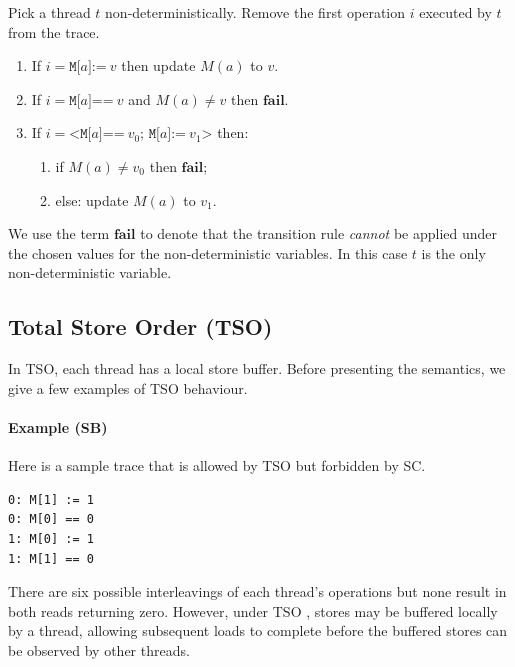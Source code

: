 \documentclass[11pt]{article}
\begin{document}
Pick a thread $t$ non-deterministically.  Remove the first operation
$i$ executed by $t$ from the trace.

\begin{enumerate}
\item
     If $i = \texttt{M[}a\texttt{]:=}~v$ then update $M(a)$ to $v$.

\item
     If $i = \texttt{M[}a\texttt{]==}~v$ and $M(a) \neq v$
     then $\textbf{fail}$.

\item
     If $i = \texttt{<M[}a\texttt{]==}~v_0\texttt{; M[}a\texttt{]:=}~v_1
     \texttt{>}$ then:

\begin{enumerate}[i]
\item
          if $M(a) \neq v_0$ then $\textbf{fail}$;
\item
          else: update $M(a)$ to $v_1$.
\end{enumerate}
\end{enumerate}

\noindent We use the term $\textbf{fail}$ to denote that the
transition rule \emph{cannot} be applied under the chosen values for
the non-deterministic variables.  In this case $t$ is the only
non-deterministic variable.  

\subsection{Total Store Order (TSO)}

In TSO, each thread has a local store buffer.  Before presenting the
semantics, we give a few examples of TSO behaviour.

\paragraph{Example (SB)} Here is a sample trace that is allowed by
TSO but forbidden by SC.

\begin{verbatim}
0: M[1] := 1
0: M[0] == 0
1: M[0] := 1
1: M[1] == 0
\end{verbatim}

\noindent There are six possible interleavings of each thread's
operations but none result in both reads returning zero.  However,
under TSO \cite{SPARC}, stores may be buffered locally by a thread,
allowing subsequent loads to complete before the buffered stores can
be observed by other threads.
\end{document}
